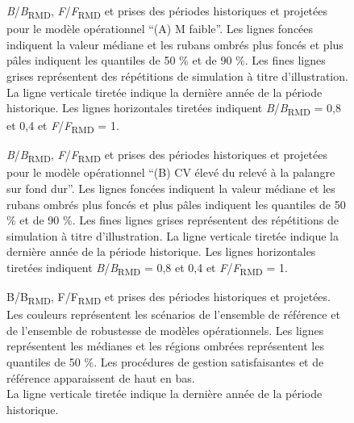 \documentclass[11pt]{book}
\begin{document}
\begin{figure}[htb]

{\centering {} 

}

\caption{\emph{B}/\emph{B}\textsubscript{RMD}, \emph{F}/\emph{F}\textsubscript{RMD} et prises des périodes historiques et projetées pour le modèle opérationnel ``(A) M faible''. Les lignes foncées indiquent la valeur médiane et les rubans ombrés plus foncés et plus pâles indiquent les quantiles de 50 \% et de 90 \%. Les fines lignes grises représentent des répétitions de simulation à titre d'illustration. La ligne verticale tiretée indique la dernière année de la période historique. Les lignes horizontales tiretées indiquent \emph{B}/\emph{B}\textsubscript{RMD} = 0,8 et 0,4 et \emph{F}/\emph{F}\textsubscript{RMD} = 1.}\label{fig:proj-low-m}
\end{figure}

\begin{figure}[htb]

{\centering {} 

}

\caption{\emph{B}/\emph{B}\textsubscript{RMD}, \emph{F}/\emph{F}\textsubscript{RMD} et prises des périodes historiques et projetées pour le modèle opérationnel ``(B) CV élevé du relevé à la palangre sur fond dur''. Les lignes foncées indiquent la valeur médiane et les rubans ombrés plus foncés et plus pâles indiquent les quantiles de 50 \% et de 90 \%. Les fines lignes grises représentent des répétitions de simulation à titre d'illustration. La ligne verticale tiretée indique la dernière année de la période historique. Les lignes horizontales tiretées indiquent \emph{B}/\emph{B}\textsubscript{RMD} = 0,8 et 0,4 et \emph{F}/\emph{F}\textsubscript{RMD} = 1.}\label{fig:proj-high-index-cv}
\end{figure}


\begin{figure}[htb]

{\centering {} 

}

\caption{B/B\textsubscript{RMD}, F/F\textsubscript{RMD} et prises des périodes historiques et projetées. Les couleurs représentent les scénarios de l'ensemble de référence et de l'ensemble de robustesse de modèles opérationnels. Les lignes représentent les médianes et les régions ombrées représentent les quantiles de 50 \%. Les procédures de gestion satisfaisantes et de référence apparaissent de haut en bas.\\
La ligne verticale tiretée indique la dernière année de la période historique.}\label{fig:proj-scenarios}
\end{figure}
\clearpage
\end{document}
